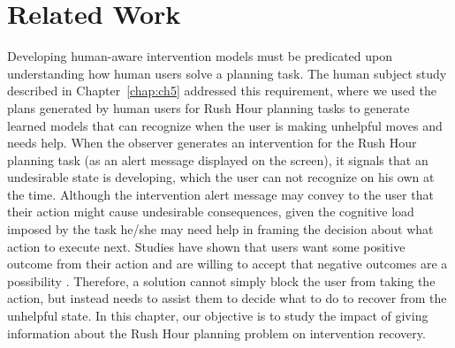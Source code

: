 \section{Related Work}
Developing human-aware intervention models must be predicated upon understanding how human users solve a planning task. 
The human subject study described in Chapter~\ref{chap:ch5} addressed this requirement, where we used the plans generated by human users for Rush Hour planning tasks to generate learned models that can recognize when the user is making unhelpful moves and needs help.
When the observer generates an intervention for the Rush Hour planning task (as an alert message displayed on the screen), it signals that an undesirable state is developing, which the user can not recognize on his own at the time.
Although the intervention alert message may convey to the user that their action might cause undesirable consequences, given the cognitive load imposed by the task he/she may need help in framing the decision about what action to execute next. 
Studies have shown that users want some positive outcome from their action and are willing to accept that negative outcomes are a possibility \cite{good2005stopping, govani2005, debatin2009facebook, byrne2016}. 
Therefore, a solution cannot simply block the user from taking the action, but instead needs to assist them to decide what to do to recover from the unhelpful state. 
In this chapter, our objective is to study the impact of giving information about the Rush Hour planning problem on intervention recovery.

